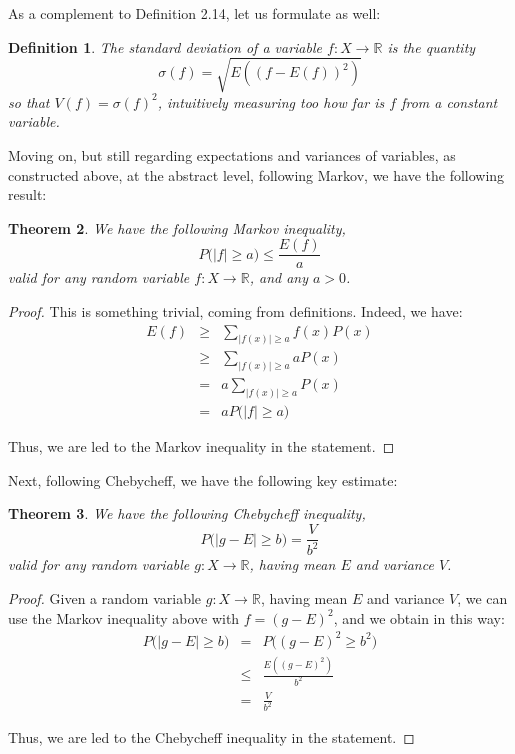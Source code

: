 \documentclass[12pt]{amsbook}
\newtheorem{theorem}{Theorem}[chapter]
\newtheorem{definition}[theorem]{Definition}
\begin{document}
As a complement to Definition 2.14, let us formulate as well:


\begin{definition}
The standard deviation of a variable $f:X\to\mathbb R$ is the quantity
$$\sigma(f)=\sqrt{E\left((f-E(f))^2\right)}$$
so that $V(f)=\sigma(f)^2$, intuitively measuring too how far is $f$ from a constant variable.
\end{definition}

Moving on, but still regarding expectations and variances of variables, as constructed above, at the abstract level, following Markov, we have the following result:


\begin{theorem}
We have the following Markov inequality,
$$P\big(|f|\geq a\big)\leq\frac{E(f)}{a}$$
valid for any random variable $f:X\to\mathbb R$, and any $a>0$.
\end{theorem}

\begin{proof}
This is something trivial, coming from definitions. Indeed, we have:
\begin{eqnarray*}
E(f)
&\geq&\sum_{|f(x)|\geq a}f(x)P(x)\\
&\geq&\sum_{|f(x)|\geq a}aP(x)\\
&=&a\sum_{|f(x)|\geq a}P(x)\\
&=&aP\big(|f|\geq a\big)
\end{eqnarray*}

Thus, we are led to the Markov inequality in the statement.
\end{proof}

Next, following Chebycheff, we have the following key estimate:


\begin{theorem}
We have the following Chebycheff inequality,
$$P\big(|g-E|\geq b\big)=\frac{V}{b^2}$$
valid for any random variable $g:X\to\mathbb R$, having mean $E$ and variance $V$.
\end{theorem}

\begin{proof}
Given a random variable $g:X\to\mathbb R$, having mean $E$ and variance $V$, we can use the Markov inequality above with $f=(g-E)^2$, and we obtain in this way:
\begin{eqnarray*}
P\big(|g-E|\geq b\big)
&=&P\big((g-E)^2\geq b^2\big)\\
&\leq&\frac{E((g-E)^2)}{b^2}\\
&=&\frac{V}{b^2}
\end{eqnarray*}

Thus, we are led to the Chebycheff inequality in the statement.
\end{proof}
\end{document}
